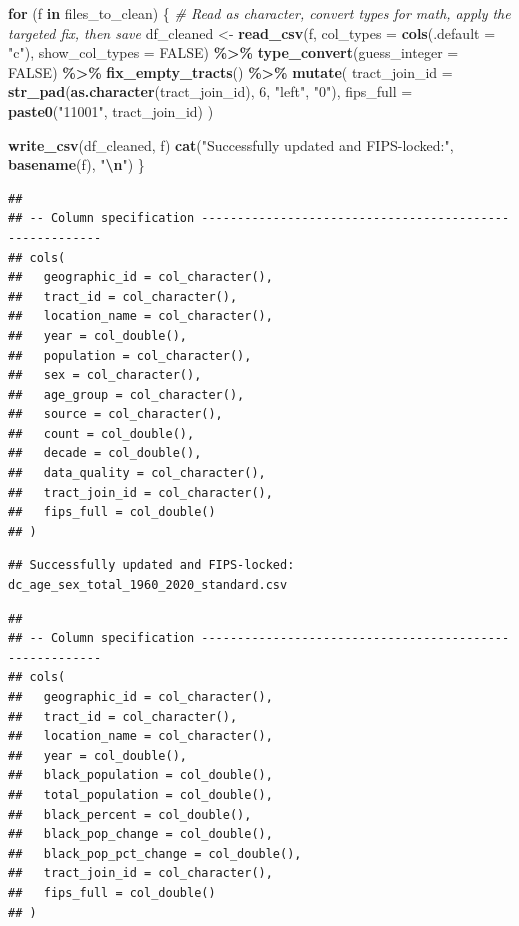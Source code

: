 \documentclass[
]{article}
\newenvironment{Shaded}{\begin{snugshade}}{\end{snugshade}}
\newcommand{\AttributeTok}[1]{\textcolor[rgb]{0.13,0.29,0.53}{#1}}
\newcommand{\CommentTok}[1]{\textcolor[rgb]{0.56,0.35,0.01}{\textit{#1}}}
\newcommand{\ConstantTok}[1]{\textcolor[rgb]{0.56,0.35,0.01}{#1}}
\newcommand{\ControlFlowTok}[1]{\textcolor[rgb]{0.13,0.29,0.53}{\textbf{#1}}}
\newcommand{\DecValTok}[1]{\textcolor[rgb]{0.00,0.00,0.81}{#1}}
\newcommand{\FunctionTok}[1]{\textcolor[rgb]{0.13,0.29,0.53}{\textbf{#1}}}
\newcommand{\NormalTok}[1]{#1}
\newcommand{\OtherTok}[1]{\textcolor[rgb]{0.56,0.35,0.01}{#1}}
\newcommand{\SpecialCharTok}[1]{\textcolor[rgb]{0.81,0.36,0.00}{\textbf{#1}}}
\newcommand{\StringTok}[1]{\textcolor[rgb]{0.31,0.60,0.02}{#1}}
\begin{document}
\begin{Shaded}
\begin{Highlighting}[]
\ControlFlowTok{for}\NormalTok{ (f }\ControlFlowTok{in}\NormalTok{ files\_to\_clean) \{}
  \CommentTok{\# Read as character, convert types for math, apply the targeted fix, then save}
\NormalTok{  df\_cleaned }\OtherTok{\textless{}{-}} \FunctionTok{read\_csv}\NormalTok{(f, }\AttributeTok{col\_types =} \FunctionTok{cols}\NormalTok{(}\AttributeTok{.default =} \StringTok{"c"}\NormalTok{), }\AttributeTok{show\_col\_types =} \ConstantTok{FALSE}\NormalTok{) }\SpecialCharTok{\%\textgreater{}\%}
    \FunctionTok{type\_convert}\NormalTok{(}\AttributeTok{guess\_integer =} \ConstantTok{FALSE}\NormalTok{) }\SpecialCharTok{\%\textgreater{}\%}
    \FunctionTok{fix\_empty\_tracts}\NormalTok{() }\SpecialCharTok{\%\textgreater{}\%}
    \FunctionTok{mutate}\NormalTok{(}
      \AttributeTok{tract\_join\_id =} \FunctionTok{str\_pad}\NormalTok{(}\FunctionTok{as.character}\NormalTok{(tract\_join\_id), }\DecValTok{6}\NormalTok{, }\StringTok{"left"}\NormalTok{, }\StringTok{"0"}\NormalTok{),}
      \AttributeTok{fips\_full =} \FunctionTok{paste0}\NormalTok{(}\StringTok{"11001"}\NormalTok{, tract\_join\_id)}
\NormalTok{    )}
  
  \FunctionTok{write\_csv}\NormalTok{(df\_cleaned, f)}
  \FunctionTok{cat}\NormalTok{(}\StringTok{"Successfully updated and FIPS{-}locked:"}\NormalTok{, }\FunctionTok{basename}\NormalTok{(f), }\StringTok{"}\SpecialCharTok{\textbackslash{}n}\StringTok{"}\NormalTok{)}
\NormalTok{\}}
\end{Highlighting}
\end{Shaded}

\begin{verbatim}
## 
## -- Column specification --------------------------------------------------------
## cols(
##   geographic_id = col_character(),
##   tract_id = col_character(),
##   location_name = col_character(),
##   year = col_double(),
##   population = col_character(),
##   sex = col_character(),
##   age_group = col_character(),
##   source = col_character(),
##   count = col_double(),
##   decade = col_double(),
##   data_quality = col_character(),
##   tract_join_id = col_character(),
##   fips_full = col_double()
## )
\end{verbatim}

\begin{verbatim}
## Successfully updated and FIPS-locked: dc_age_sex_total_1960_2020_standard.csv
\end{verbatim}

\begin{verbatim}
## 
## -- Column specification --------------------------------------------------------
## cols(
##   geographic_id = col_character(),
##   tract_id = col_character(),
##   location_name = col_character(),
##   year = col_double(),
##   black_population = col_double(),
##   total_population = col_double(),
##   black_percent = col_double(),
##   black_pop_change = col_double(),
##   black_pop_pct_change = col_double(),
##   tract_join_id = col_character(),
##   fips_full = col_double()
## )
\end{verbatim}
\end{document}
